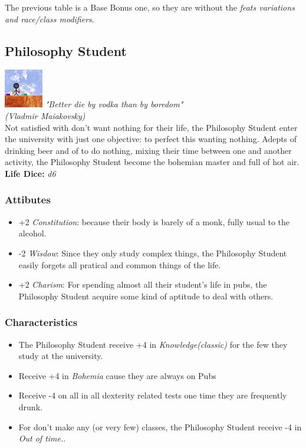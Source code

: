 \documentclass[ letterpaper,12pt]{article}
\begin{document}
{The previous table is a Base Bonus one, so they are without the {\it feats variations and race/class modifiers}.\\

\subsection{Philosophy Student}
\includegraphics{../data/classes/Img/filosofia.png}
{\it "Better die by vodka than by boredom"\\ (Vladmir Maiakovsky)}\\

Not satisfied with don't want nothing for their life, the Philosophy Student enter the university with just one objective: to perfect this wanting nothing.  Adepts  of drinking beer and of to do nothing, mixing their time between one and another  activity, the Philosophy Student become the bohemian master and full of hot air.\\

{\bf Life Dice:} {\it d6}

\subsubsection{Attibutes}
\begin{itemize}
\item{+2 {\it Constitution}: because their body is barely of a monk, fully usual to the alcohol.}
\item{-2 {\it Wisdow}: Since they only study complex things, the Philosophy  Student  easily  forgets  all pratical and common things of  the  life.}
\item{+2 {\it Charism}: For spending almost all their student's life in pubs, the  Philosophy  Student acquire some kind of aptitude to deal with others.}
\end{itemize}

\subsubsection{Characteristics}
\begin{itemize}
\item{The Philosophy Student receive +4 in {\it Knowledge(classic)} for the few they study at the university.}
\item{Receive +4 in {\it Bohemia} cause they are always on Pubs}
\item{Receive -4 on all in all dexterity related tests one time they are frequently drunk.}
\item{For don't make any (or very few) classes, the Philosophy Student receive -4 in {\it Out of time.}.}
\end{itemize}

}
\end{document}
